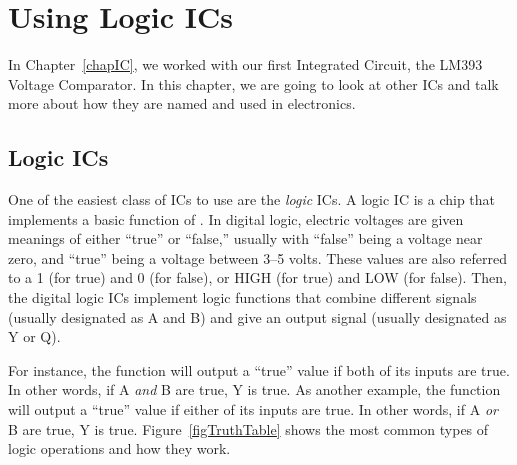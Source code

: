 \chapter{Using Logic ICs}
\label{chapLogicICs}


In Chapter~\ref{chapIC}, we worked with our first Integrated Circuit, the LM393 Voltage Comparator.  
In this chapter, we are going to look at other ICs and talk more about how they are named and used in electronics.

\section{Logic ICs}

One of the easiest class of ICs to use are the \emph{logic} ICs.  
A logic IC is a chip that implements a basic function of .
In digital logic, electric voltages are given meanings of either ``true'' or ``false,'' usually with ``false'' being a voltage near zero, and ``true'' being a voltage between 3--5 volts.
These values are also referred to a 1 (for true) and 0 (for false), or HIGH (for true) and LOW (for false).
Then, the digital logic ICs implement logic functions that combine different signals (usually designated as A and B) and give an output signal (usually designated as Y or Q).

For instance, the  function will output a ``true'' value if both of its inputs are true.  
In other words, if A \emph{and} B are true, Y is true.
As another example, the  function will output a ``true'' value if either of its inputs are true.
In other words, if A \emph{or} B are true, Y is true.
Figure~\ref{figTruthTable} shows the most common types of logic operations and how they work.

